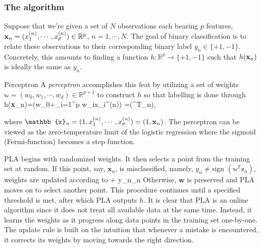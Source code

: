 \subsubsection{The algorithm}


Suppose that we're given a set of $N$ observations each bearing $p$ features, $\mathbf{x}_n=(x_1^{(n)},\cdots, x_p^{(n)})\in\mathbb{R}^p$, $n=1,\cdots, N$. The goal of binary classification is to relate these observations to their corresponding binary label $y_n \in\{+1,-1\}$. Concretely, this amounts to finding a function $h: \mathbb{R}^p\rightarrow \{+1,-1\}$ such that $h(\mathbf{x}_n)$ is ideally the same as $y_n$. 
\begin{mybox}{Perceptron} 
	A \emph{perceptron} accomplishes this feat by utilizing a set of weights $\mathbb{w}=(w_0,w_1,\cdots, w_d)\in\mathbb{R}^{p+1}$ to construct $h$ so that labelling is done through
\be 
	h(\textbf{x}_n)=\left(w_0+\sum_{i=1}^p w_ix_i^{(n)}\right) =(^T_n),
	\ee 
	
	where $\mathbb{x}_n=(1,x_1^{(n)},\cdots, x_p^{(n)}) = (1,\mx_n)$. The perceptron can be viewed as the zero-temperature limit of the logistic regression where the sigmoid (Fermi-function) becomes a step function.
	
\end{mybox}

PLA begins with randomized weights. It then selects a point from the training set at random. If this point, say, $\textbf{x}_n$, is misclassified, namely, $y_n\neq \text{sign }(\mathbb{w}^T\mathbb{x}_n)$, weights are updated according to 
\be 
{}\leftarrow {}+ y_n_n
\ee 
Otherwise, $\textbf{w}$ is preserved and PLA moves on to select another point. This procedure continues until a specified threshold is met, after which PLA outputs $h$. It is clear that PLA is an online algorithm since it does not treat all available data at the same time. Instead, it learns the weights as it progress along data points in the training set one-by-one. The update rule is built on the intuition that whenever a mistake is encountered, it corrects its weights by moving towards the right direction. 












